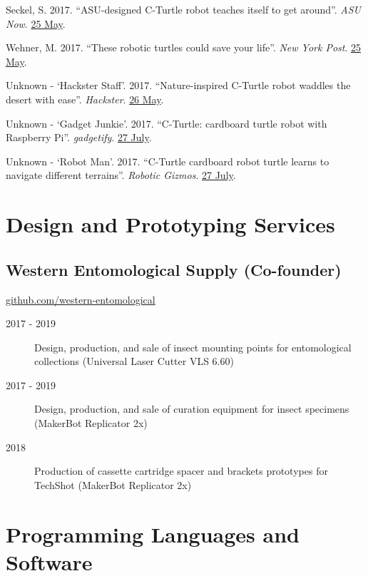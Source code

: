\documentclass[12pt,a4paper]{article}
\begin{document}
\begin{description}
			\item Seckel, S. 2017. ``ASU-designed C-Turtle robot teaches itself to get around''. \textit{ASU Now}. \href{https://asunow.asu.edu/20170525-solutions-asu-designed-c-turtle-robot-teaches-itself-get-around}{25 May}.
			\item Wehner, M. 2017. ``These robotic turtles could save your life''. \textit{New York Post}. \href{https://nypost.com/2017/05/25/these-robotic-turtles-could-save-your-life/}{25 May}.
			\item Unknown - `Hackster Staff'. 2017. ``Nature-inspired C-Turtle robot waddles the desert with ease''. \textit{Hackster}. \href{https://blog.hackster.io/nature-inspired-c-turtle-robot-waddles-the-desert-with-ease-3061cbc19b36}{26 May}.
			\item Unknown - `Gadget Junkie'. 2017. ``C-Turtle: cardboard turtle robot with Raspberry Pi''. \textit{gadgetify}. \href{http://www.gadgetify.com/c-turtle-cardboard-turtle-robot/}{27 July}.
			\item Unknown - `Robot Man'. 2017. ``C-Turtle cardboard robot turtle learns to navigate different terrains''. \textit{Robotic Gizmos}. \href{http://www.roboticgizmos.com/c-turtle-robot-turtle/}{27 July}.
		\end{description}

\section*{Design and Prototyping Services}
	\subsection*{Western Entomological Supply (Co-founder)}
		\href{https://github.com/western-entomological}{github.com/western-entomological}
		\begin{description}
			\item [2017 - 2019] Design, production, and sale of insect mounting points for entomological collections (Universal Laser Cutter VLS 6.60)
			\item [2017 - 2019] Design, production, and sale of curation equipment for insect specimens (MakerBot Replicator 2x)
			\item [2018] Production of cassette cartridge spacer and brackets prototypes for TechShot (MakerBot Replicator 2x)
		\end{description}
	
\section*{Programming Languages and Software}
\end{document}
